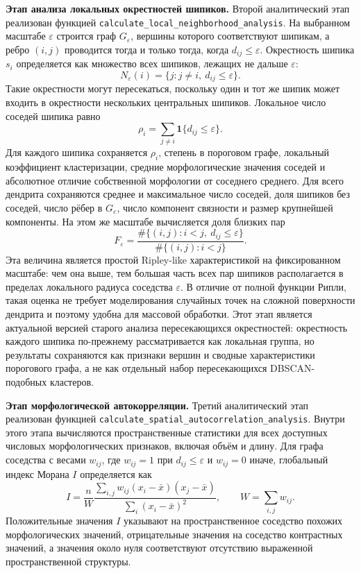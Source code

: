 \documentclass[12pt,a4paper]{article}
\begin{document}
\noindent\textbf{Этап анализа локальных окрестностей шипиков.}
Второй аналитический этап реализован функцией \texttt{calculate\_local\_neighborhood\_analysis}. На выбранном масштабе \(\varepsilon\) строится граф \(G_\varepsilon\), вершины которого соответствуют шипикам, а ребро \((i,j)\) проводится тогда и только тогда, когда \(d_{ij}\leq\varepsilon\). Окрестность шипика \(s_i\) определяется как множество всех шипиков, лежащих не дальше \(\varepsilon\):
\[
N_\varepsilon(i)=\{j:j\neq i,\ d_{ij}\leq\varepsilon\}.
\]
Такие окрестности могут пересекаться, поскольку один и тот же шипик может входить в окрестности нескольких центральных шипиков. Локальное число соседей шипика равно
\[
\rho_i=\sum_{j\neq i}\mathbf{1}\{d_{ij}\leq\varepsilon\}.
\]
Для каждого шипика сохраняется \(\rho_i\), степень в пороговом графе, локальный коэффициент кластеризации, средние морфологические значения соседей и абсолютное отличие собственной морфологии от соседнего среднего. Для всего дендрита сохраняются среднее и максимальное число соседей, доля шипиков без соседей, число рёбер в \(G_\varepsilon\), число компонент связности и размер крупнейшей компоненты. На этом же масштабе вычисляется доля близких пар
\[
F_\varepsilon=\frac{\#\{(i,j):i<j,\ d_{ij}\leq\varepsilon\}}{\#\{(i,j):i<j\}}.
\]
Эта величина является простой Ripley-like характеристикой на фиксированном масштабе: чем она выше, тем большая часть всех пар шипиков располагается в пределах локального радиуса соседства \(\varepsilon\). В отличие от полной функции Рипли, такая оценка не требует моделирования случайных точек на сложной поверхности дендрита и поэтому удобна для массовой обработки. Этот этап является актуальной версией старого анализа пересекающихся окрестностей: окрестность каждого шипика по-прежнему рассматривается как локальная группа, но результаты сохраняются как признаки вершин и сводные характеристики порогового графа, а не как отдельный набор пересекающихся DBSCAN-подобных кластеров.

\noindent\textbf{Этап морфологической автокорреляции.}
Третий аналитический этап реализован функцией \texttt{calculate\_spatial\_autocorrelation\_analysis}. Внутри этого этапа вычисляются пространственные статистики для всех доступных числовых морфологических признаков, включая объём и длину. Для графа соседства с весами \(w_{ij}\), где \(w_{ij}=1\) при \(d_{ij}\leq\varepsilon\) и \(w_{ij}=0\) иначе, глобальный индекс Морана \(I\) определяется как
\[
I=\frac{n}{W}\frac{\sum_{i,j}w_{ij}(x_i-\bar x)(x_j-\bar x)}{\sum_i(x_i-\bar x)^2},
\qquad W=\sum_{i,j}w_{ij}.
\]
Положительные значения \(I\) указывают на пространственное соседство похожих морфологических значений, отрицательные значения на соседство контрастных значений, а значения около нуля соответствуют отсутствию выраженной пространственной структуры.
\end{document}
